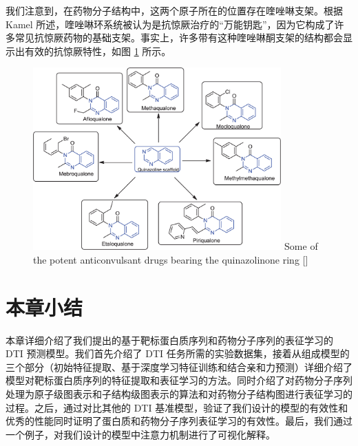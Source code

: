 我们注意到，在药物分子结构中，这两个原子所在的位置存在喹唑啉支架。根据 Kamel \cite{kamel2016synthetic}所述，喹唑啉环系统被认为是抗惊厥治疗的“万能钥匙”，因为它构成了许多常见抗惊厥药物的基础支架。事实上，许多带有这种喹唑啉酮支架的结构都会显示出有效的抗惊厥特性，如图 \ref{fig:quinaz} 所示。


\begin{figure}[!htbp] 
\centering
\includegraphics[width=0.85\textwidth]  {imgs/derivatives.jpg}
{Some of the potent anticonvulsant drugs bearing the quinazolinone ring [\cite{kamel2016synthetic}]}
\label{fig:quinaz}
\end{figure}

\section{本章小结}
本章详细介绍了我们提出的基于靶标蛋白质序列和药物分子序列的表征学习的 DTI 预测模型。我们首先介绍了 DTI 任务所需的实验数据集，接着从组成模型的三个部分（初始特征提取、基于深度学习特征训练和结合亲和力预测）详细介绍了模型对靶标蛋白质序列的特征提取和表征学习的方法。同时介绍了对药物分子序列处理为原子级图表示和子结构级图表示的算法和对药物分子结构图进行表征学习的过程。之后，通过对比其他的 DTI 基准模型，验证了我们设计的模型的有效性和优秀的性能同时证明了蛋白质和药物分子序列表征学习的有效性。最后，我们通过一个例子，对我们设计的模型中注意力机制进行了可视化解释。